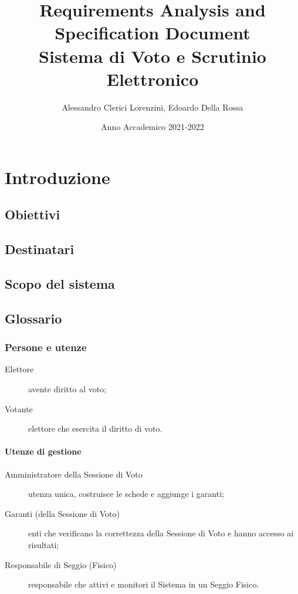 \documentclass{report}
\begin{document}
\title{Requirements Analysis and Specification Document \\
\large Sistema di Voto e Scrutinio Elettronico}
\author{Alessandro Clerici Lorenzini, Edoardo Della Rossa}
\date{Anno Accademico 2021-2022}

\maketitle
\tableofcontents






\chapter{Introduzione}




\section{Obiettivi}




\section{Destinatari}




\section{Scopo del sistema}




\section{Glossario}


\subsection{Persone e utenze}
\begin{description}
	\item[Elettore] avente diritto al voto;
	\item[Votante] elettore che esercita il diritto di voto.
\end{description}

\subsubsection{Utenze di gestione}
\begin{description}
	\item[Amministratore della Sessione di Voto] utenza unica, costruisce le schede e aggiunge i garanti;
	\item[Garanti (della Sessione di Voto)] enti che verificano la correttezza della Sessione di Voto e hanno accesso ai risultati;
	\item[Responsabile di Seggio (Fisico)] responsabile che attivi e monitori il Sistema in un Seggio Fisico.
\end{description}
\end{document}
